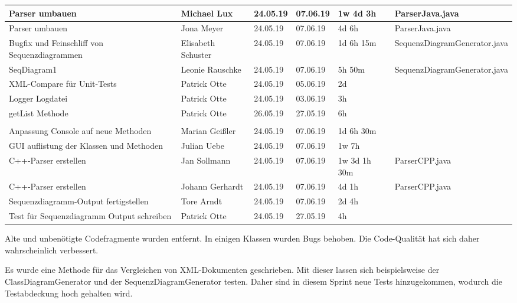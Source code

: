\begin{longtable}{|p{4cm}|l|l|l|l|l|}
        \hline
        Parser umbauen & Michael Lux & 24.05.19 & 07.06.19 & 1w 4d 3h & ParserJava.java\\
        \hline
        Parser umbauen & Jona Meyer & 24.05.19 & 07.06.19 & 4d 6h & ParserJava.java\\
        \hline
        Bugfix und Feinschliff von Sequenzdiagrammen & Elisabeth Schuster & 24.05.19 & 07.06.19 & 1d 6h 15m & SequenzDiagramGenerator.java\\
        \hline
        SeqDiagram1 & Leonie Rauschke & 24.05.19 & 07.06.19 & 5h 50m & SequenzDiagramGenerator.java\\
        \hline 
        XML-Compare für Unit-Tests & Patrick Otte & 24.05.19 & 05.06.19 & 2d & \\
        \hline
        Logger Logdatei & Patrick Otte & 24.05.19 & 03.06.19 & 3h &\\
        \hline
        getList Methode & Patrick Otte & 26.05.19 & 27.05.19 & 6h & \\
        \hline\\
        Anpassung Console auf neue Methoden & Marian Geißler & 24.05.19 & 07.06.19 & 1d 6h 30m & \\
        \hline
        GUI auflistung der Klassen und Methoden & Julian Uebe & 24.05.19 & 07.06.19 & 1w 7h & \\
        \hline
        C++-Parser erstellen & Jan Sollmann & 24.05.19 & 07.06.19 & 1w 3d 1h 30m  & ParserCPP.java\\
        \hline
        C++-Parser erstellen & Johann Gerhardt & 24.05.19 & 07.06.19 & 4d 1h  & ParserCPP.java\\
        \hline
        Sequenzdiagramm-Output fertigstellen & Tore Arndt & 24.05.19 & 07.06.19 & 2d 4h & \\
        \hline   
        Test für Sequenzdiagramm Output schreiben & Patrick Otte & 24.05.19 & 27.05.19 & 4h & \\
        \hline     
\hline
\end{longtable}     
\nsecend

Alte und unbenötigte Codefragmente wurden entfernt. In einigen Klassen wurden Bugs behoben. Die Code-Qualität hat sich daher wahrscheinlich verbessert.
\nsecend%

Es wurde eine Methode für das Vergleichen von XML-Dokumenten geschrieben. Mit dieser lassen sich beispielsweise der ClassDiagramGenerator und der SequenzDiagramGenerator testen. Daher sind in diesem Sprint neue Tests hinzugekommen, wodurch die Testabdeckung hoch gehalten wird.
\nsecend%

